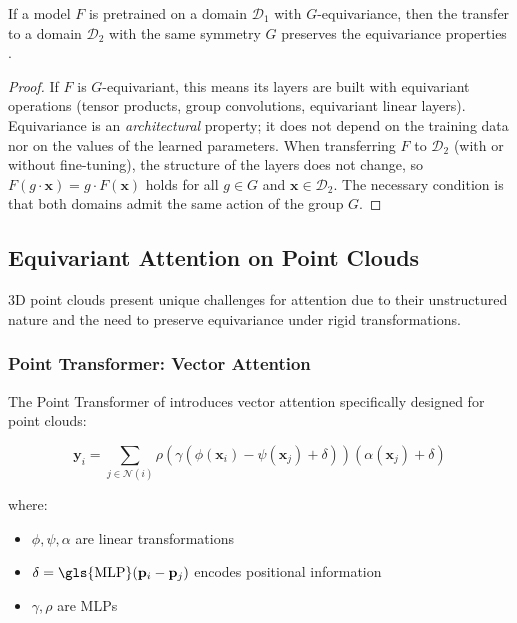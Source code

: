 \begin{proposition}
    If a model $F$ is pretrained on a domain $\mathcal{D}_1$ with $G$-equivariance, then the transfer to a domain $\mathcal{D}_2$ with the same symmetry $G$ preserves the equivariance properties \citep{jiao2024ept}.
\end{proposition}

\begin{proof}
If $F$ is $G$-equivariant, this means its layers are built with equivariant operations (tensor products, group convolutions, equivariant linear layers). Equivariance is an \emph{architectural} property; it does not depend on the training data nor on the values of the learned parameters. When transferring $F$ to $\mathcal{D}_2$ (with or without fine-tuning), the structure of the layers does not change, so $F(g \cdot \mathbf{x}) = g \cdot F(\mathbf{x})$ holds for all $g \in G$ and $\mathbf{x} \in \mathcal{D}_2$. The necessary condition is that both domains admit the same action of the group $G$.
\end{proof}

\subsection{Equivariant Attention on Point Clouds}

3D point clouds present unique challenges for attention due to their unstructured nature and the need to preserve equivariance under rigid transformations.

\subsubsection{Point \gls{Transformer}: Vector Attention}

The Point \gls{Transformer} of \citet{zhao2021point} introduces vector attention specifically designed for point clouds:

\begin{equation}
    \mathbf{y}_i = \sum_{j \in \mathcal{N}(i)} \rho(\gamma(\phi(\mathbf{x}_i) - \psi(\mathbf{x}_j) + \delta))(\alpha(\mathbf{x}_j) + \delta)
    \label{eq:point_transformer_attention}
\end{equation}

where:
\begin{itemize}
    \item $\phi, \psi, \alpha$ are linear transformations
    \item $\delta = \text{\gls{MLP}}(\mathbf{p}_i - \mathbf{p}_j)$ encodes positional information
    \item $\gamma, \rho$ are \glspl{MLP}
\end{itemize}

